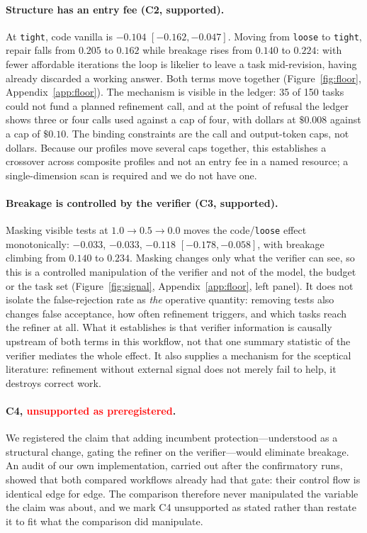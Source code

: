 \documentclass{article}
\begin{document}
\paragraph{Structure has an entry fee (C2, supported).} At \texttt{tight}, code
vanilla is $-0.104$ $[-0.162,-0.047]$. Moving from \texttt{loose} to
\texttt{tight}, repair falls from $0.205$ to $0.162$ while breakage rises from
$0.140$ to $0.224$: with fewer affordable iterations the loop is likelier to
leave a task mid-revision, having already discarded a working answer. Both terms move together (Figure~\ref{fig:floor}, Appendix~\ref{app:floor}). The
mechanism is visible in the ledger: 35 of 150 tasks could not fund a planned
refinement call, and at the point of refusal the ledger shows three or four
calls used against a cap of four, with dollars at $\$0.008$ against a cap of
$\$0.10$. The binding constraints are the call and output-token caps, not
dollars. Because our profiles move several caps together, this establishes a
crossover across composite profiles and not an entry fee in a named resource;
a single-dimension scan is required and we do not have one.

\paragraph{Breakage is controlled by the verifier (C3, supported).} Masking
visible tests at $1.0 \to 0.5 \to 0.0$ moves the code/\texttt{loose} effect
monotonically: $-0.033$, $-0.033$, $-0.118$ $[-0.178,-0.058]$, with breakage
climbing from $0.140$ to $0.234$. Masking changes only what the verifier can
see, so this is a controlled manipulation of the verifier and not of the model,
the budget or the task set (Figure~\ref{fig:signal},
Appendix~\ref{app:floor}, left panel). It does not isolate the false-rejection
rate as \emph{the} operative quantity: removing tests also changes false
acceptance, how often refinement triggers, and which tasks reach the refiner at
all. What it establishes is that verifier information is causally upstream of
both terms in this workflow, not that one summary statistic of the verifier
mediates the whole effect.
It also supplies a mechanism for the sceptical literature: refinement without
external signal does not merely fail to help, it destroys correct work.

\paragraph{C4, \textcolor{red}{unsupported as preregistered}.} We registered
the claim that adding incumbent protection---understood as a structural change,
gating the refiner on the verifier---would eliminate breakage. An audit of our
own implementation, carried out after the confirmatory runs, showed that both
compared workflows already had that gate: their control flow is identical edge
for edge. The comparison therefore never manipulated the variable the claim was
about, and we mark C4 unsupported as stated rather than restate it to fit what
the comparison did manipulate.
\end{document}
